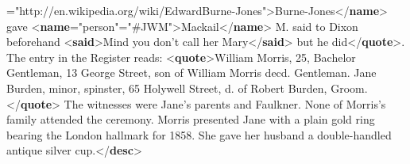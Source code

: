 \begin{shaded}
{\hspace*{1em}\hspace*{1em}\hspace*{1em}\hspace*{1em}{ref}="{http://en.wikipedia.org/wiki/Edward\textunderscore Burne-Jones}">}Burne-Jones{</\textbf{name}>} gave {<\textbf{name}\hspace*{1em}{type}="{person}"\hspace*{1em}{ref}="{\#JWM}">}Mackail{</\textbf{name}>}\mbox{}\newline 
\hspace*{1em}\hspace*{1em}M. said to Dixon beforehand {<\textbf{said}>}Mind you don't call her Mary{</\textbf{said}>} but he did{</\textbf{quote}>}. The entry in\mbox{}\newline 
\hspace*{1em}\hspace*{1em}\hspace*{1em}\hspace*{1em} the Register reads: {<\textbf{quote}>}William Morris, 25, Bachelor Gentleman, 13 George Street, son of William Morris decd.\mbox{}\newline 
\hspace*{1em}\hspace*{1em}\hspace*{1em}\hspace*{1em}\hspace*{1em}\hspace*{1em} Gentleman. Jane Burden, minor, spinster, 65 Holywell Street, d. of Robert Burden, Groom.{</\textbf{quote}>} The witnesses\mbox{}\newline 
\hspace*{1em}\hspace*{1em}\hspace*{1em}\hspace*{1em} were Jane's parents and Faulkner. None of Morris's family attended the ceremony. Morris presented Jane with a\mbox{}\newline 
\hspace*{1em}\hspace*{1em}\hspace*{1em}\hspace*{1em} plain gold ring bearing the London hallmark for 1858. She gave her husband a double-handled antique silver\mbox{}\newline 
\hspace*{1em}\hspace*{1em}\hspace*{1em}\hspace*{1em} cup.{</\textbf{desc}>}\mbox{}\newline 

\end{shaded}
